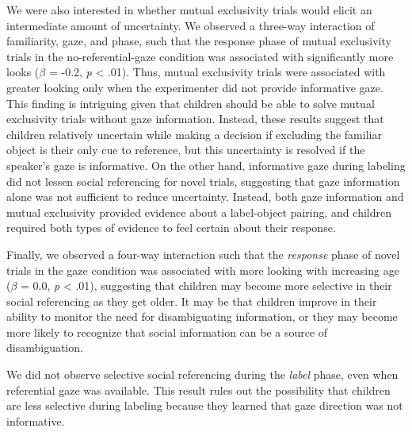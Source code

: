 \documentclass[a4paper,man,apacite,floatsintext]{apa6}
\begin{document}
We were also interested in whether mutual exclusivity trials would
elicit an intermediate amount of uncertainty. We observed a three-way
interaction of familiarity, gaze, and phase, such that the response
phase of mutual exclusivity trials in the no-referential-gaze condition
was associated with significantly more looks (\(\beta\) = -0.2, \emph{p}
\textless{} .01). Thus, mutual exclusivity trials were associated with
greater looking only when the experimenter did not provide informative
gaze. This finding is intriguing given that children should be able to
solve mutual exclusivity trials without gaze information. Instead, these
results suggest that children relatively uncertain while making a
decision if excluding the familiar object is their only cue to
reference, but this uncertainty is resolved if the speaker's gaze is
informative. On the other hand, informative gaze during labeling did not
lessen social referencing for novel trials, suggesting that gaze
information alone was not sufficient to reduce uncertainty. Instead,
both gaze information and mutual exclusivity provided evidence about a
label-object pairing, and children required both types of evidence to
feel certain about their response.

Finally, we observed a four-way interaction such that the
\emph{response} phase of novel trials in the gaze condition was
associated with more looking with increasing age (\(\beta\) = 0.0,
\emph{p} \textless{} .01), suggesting that children may become more
selective in their social referencing as they get older. It may be that
children improve in their ability to monitor the need for disambiguating
information, or they may become more likely to recognize that social
information can be a source of disambiguation.

We did not observe selective social referencing during the \emph{label}
phase, even when referential gaze was available. This result rules out
the possibility that children are less selective during labeling because
they learned that gaze direction was not informative.
\end{document}
